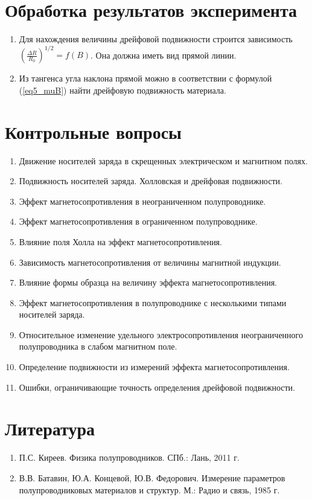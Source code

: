 \section{Обработка результатов эксперимента}
\begin{enumerate}
\item Для нахождения величины дрейфовой подвижности строится зависимость $\left( \frac{\Delta R}{R_{0}} \right)^{1/2} = f(B)$. Она должна иметь вид прямой линии.
\item Из тангенса угла наклона прямой можно в соответствии с формулой (\ref{eq5_muB}) найти дрейфовую подвижность материала.
\end{enumerate}

\section{Контрольные вопросы}
\begin{enumerate}
\item Движение носителей заряда в скрещенных электрическом и магнитном полях.
\item Подвижность носителей заряда. Холловская и дрейфовая подвижности.
\item Эффект магнетосопротивления в неограниченном полупроводнике.
\item Эффект магнетосопротивления в ограниченном полупроводнике.
\item Влияние поля Холла на эффект магнетосопротивления.
\item Зависимость магнетосопротивления от величины магнитной индукции.
\item Влияние формы образца на величину эффекта магнетосопротивления.
\item Эффект магнетосопротивления в полупроводнике с несколькими типами носителей заряда.
\item Относительное изменение удельного электросопротивления неограниченного полупроводника в слабом магнитном поле.
\item Определение подвижности из измерений эффекта магнетосопротивления.
\item Ошибки, ограничивающие точность определения дрейфовой подвижности.
\end{enumerate}

\section{Литература}
\begin{enumerate}
\item П.С. Киреев. Физика полупроводников. СПб.: Лань, 2011 г.
\item В.В. Батавин, Ю.А. Концевой, Ю.В. Федорович. Измерение параметров полупроводниковых материалов и структур. М.: Радио и связь, 1985 г.
\end{enumerate}